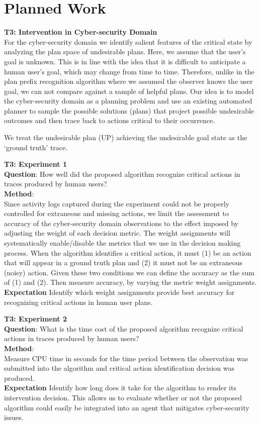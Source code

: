 \documentclass[doctor]{thesis} %
\theoremstyle{plain}
\begin{document}
\section*{Planned Work}
\textbf{T3: Intervention in Cyber-security Domain}\\
For the cyber-security domain we identify salient features of the critical state by analyzing the plan space of undesirable plans. Here, we assume that the user's goal is unknown. This is in line with the idea that it is difficult to anticipate a human user's goal, which may change from time to time. Therefore, unlike in the plan prefix recognition algorithm where we assumed the observer knows the user goal, we can not compare against a sample of helpful plans. Our idea is to model the cyber-security domain as a planning problem and use an existing automated planner to  sample the possible solutions (plans) that project possible undesirable outcomes and then trace back to actions critical to their occurrence.

We treat the undesirable plan (UP) achieving the undesirable goal state as the `ground truth' trace.

\textbf{T3: Experiment 1}\\
\textbf{Question}: How well did the proposed algorithm recognize critical actions in traces produced by human users?\\
\textbf{Method}:\\
Since activity logs captured during the experiment could not be properly controlled for extraneous and missing actions, we limit the assessment to accuracy of the cyber-security domain observations to the effect imposed by adjusting the weight of each decision metric. The weight assignments will systematically enable/disable the metrics that we use in the decision making process. When the algorithm identifies a critical action, it must (1) be an action that will appear in a ground truth plan and (2) it must not be an extraneous (noisy) action. Given these two conditions we can define the accuracy as the sum of (1) and (2). Then measure accuracy, by varying the metric weight assignments.\\
\textbf{Expectation} Identify which weight assignments provide best accuracy for recognizing critical actions in human user plans.

\textbf{T3: Experiment 2}\\
\textbf{Question}: What is the time cost of the proposed algorithm recognize critical actions in traces produced by human users?\\
\textbf{Method}:\\
Measure CPU time in seconds for the time period between the observation was submitted into the algorithm and critical action identification decision was produced.\\
\textbf{Expectation} Identify how long does it take for the algorithm to render its intervention decision. This allows us to evaluate whether or not the proposed algorithm could easily be integrated into an agent that mitigates cyber-security issues.
 
\end{document}

